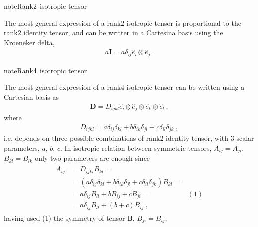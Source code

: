 \documentclass[letterpaper,10pt,english]{jupyterBook}
\begin{document}
\begin{sphinxadmonition}{note}{Rank\sphinxhyphen{}\protect\(2\protect\) isotropic tensor}

\sphinxAtStartPar
The most general expression of a rank\sphinxhyphen{}\(2\) isotropic tensor is proportional to the rank\sphinxhyphen{}\(2\) identity tensor, and can be written in a Cartesina basis using the Kroeneker delta,
\begin{equation*}
\begin{split}a \mathbf{I} = a \delta_{ij} \hat{e}_i \otimes \hat{e}_j \ .\end{split}
\end{equation*}
\sphinxAtStartPar
{} 
\end{sphinxadmonition}

\begin{sphinxadmonition}{note}{Rank\sphinxhyphen{}\protect\(4\protect\) isotropic tensor}

\sphinxAtStartPar
The most general expression of a rank\sphinxhyphen{}\(4\) isotropic tensor can be written using a Cartesian basis as
\begin{equation*}
\begin{split}\mathbf{D} = D_{ijkl} \hat{e}_i \otimes \hat{e}_j \otimes \hat{e}_k \otimes \hat{e}_l \ ,\end{split}
\end{equation*}
\sphinxAtStartPar
where
\begin{equation*}
\begin{split}D_{ijkl} = a \delta_{ij} \delta_{kl} + b \delta_{ik} \delta_{jl} + c \delta_{il}\delta_{jk} \ ,\end{split}
\end{equation*}
\sphinxAtStartPar
i.e. depends on three possible combinations of rank\sphinxhyphen{}2 identity tensor, with 3 scalar parameters, \(a\), \(b\), \(c\). In isotropic relation between symmetric tensors, \(A_{ij} = A_{ji}\), \(B_{kl} = B_{lk}\) only two parameters are enough since
\begin{equation*}
\begin{split}\begin{aligned}
  A_{ij} 
  & = D_{ijkl} B_{kl} = \\
  & = \left( a \delta_{ij} \delta_{kl} + b \delta_{ik} \delta_{jl} + c \delta_{il}\delta_{jk} \right) B_{kl} = \\
  & = a \delta_{ij} B_{ll} + b B_{ij} + c  B_{ji} =  & (1) \\
  & = a \delta_{ij} B_{ll} + (b+c) B_{ij} \ ,
\end{aligned}\end{split}
\end{equation*}
\sphinxAtStartPar
having used (1) the symmetry of tensor \(\mathbf{B}\), \(B_{ji} = B_{ij}\).


\end{sphinxadmonition}
\end{document}
